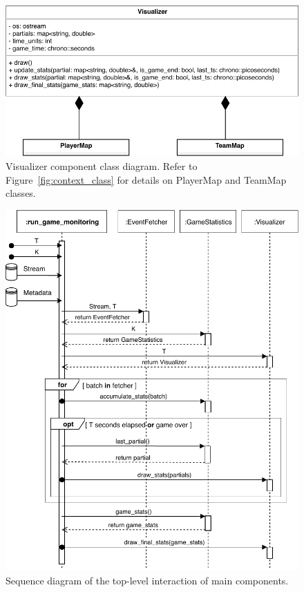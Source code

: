 \documentclass[a4paper, 11pt]{article}
\begin{document}
\begin{figure}[h]
    \centering
    \includegraphics[height=.5\textheight, width=1\textwidth, keepaspectratio]{UML/visualizer_class_diagram.pdf}
    \caption{Visualizer component class diagram. Refer to Figure~\ref{fig:context_class} for details on PlayerMap and TeamMap classes.}
    \label{fig:visualizer_class}
\end{figure}
\begin{figure}[h]
    \centering
    \includegraphics[height=.85\textheight]{UML/top_level_seq.pdf}
    \caption{Sequence diagram of the top-level interaction of main components.}
    \label{fig:top_level_seq}
\end{figure}
\end{document}

